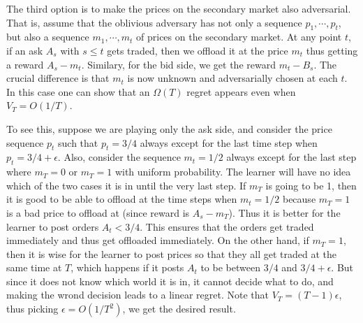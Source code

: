 \documentclass[11pt]{article}
\begin{document}
The third option is to make the prices on the secondary market also adversarial. That is, assume that the oblivious adversary has not only a sequence $p_1,\cdots , p_t$, but also a sequence $m_1, \cdots, m_t$ of prices on the secondary market. At any point $t$, if an ask $A_s$ with $s\leq t$ gets traded, then we offload it at the price $m_t$ thus getting a reward $A_s - m_t$. Similary, for the bid side, we get the reward $m_t - B_s$. The crucial difference is that $m_t$ is now unknown and adversarially chosen at each $t$. In this case one can show that an $\Omega(T)$ regret appears even when $V_T = O(1/T)$. 

To see this, suppose we are playing only the ask side, and consider the price sequence $p_t$ such that $p_t = 3/4$ always except for the last time step when $p_t = 3/4 + \epsilon$. Also, consider the sequence $m_t = 1/2$ always except for the last step where $m_T = 0$ or $m_T = 1$ with uniform probability. The learner will have no idea which of the two cases it is in until the very last step. If $m_T$ is going to be 1, then it is good to be able to offload at the time steps when $m_t = 1/2$ because $m_T = 1$ is a bad price to offload at (since reward is $A_s - m_T$). Thus it is better for the learner to post orders $A_t < 3/4$. This ensures that the orders get traded immediately and thus get offloaded immediately. On the other hand, if $m_T = 1$, then it is wise for the learner to post prices so that they all get traded at the same time at $T$, which happens if it posts $A_t$ to be between $3/4$ and $3/4 + \epsilon$. But since it does not know which world it is in, it cannot decide what to do, and making the wrond decision leads to a linear regret. Note that $V_T = (T-1)\epsilon$, thus picking $\epsilon = O(1/T^2)$, we get the desired result. 
\end{document}
